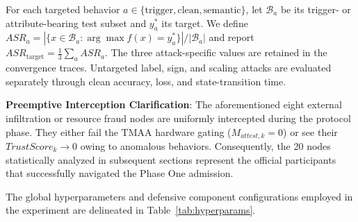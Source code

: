 \documentclass[final,5p,times,twocolumn]{elsarticle/elsarticle}
\begin{document}
For each targeted behavior $a\in\{\mathrm{trigger},\mathrm{clean},\mathrm{semantic}\}$,
let $\mathcal{B}_a$ be its trigger- or attribute-bearing test subset and
$y_a^*$ its target. We define
$ASR_a=|\{x\in\mathcal{B}_a:\arg\max f(x)=y_a^*\}|/|\mathcal{B}_a|$
and report $ASR_{\mathrm{target}}=\frac{1}{3}\sum_a ASR_a$. The three
attack-specific values are retained in the convergence traces. Untargeted
label, sign, and scaling attacks are evaluated separately through clean
accuracy, loss, and state-transition time.

\textbf{Preemptive Interception Clarification}: The aforementioned eight external infiltration or resource fraud nodes are uniformly intercepted during the protocol phase. They either fail the TMAA hardware gating ($M_{attest,k}=0$) or see their $TrustScore_k \to 0$ owing to anomalous behaviors. Consequently, the 20 nodes statistically analyzed in subsequent sections represent the official participants that successfully navigated the Phase One admission.

The global hyperparameters and defensive component configurations employed in the experiment are delineated in Table~\ref{tab:hyperparams}.
\end{document}
